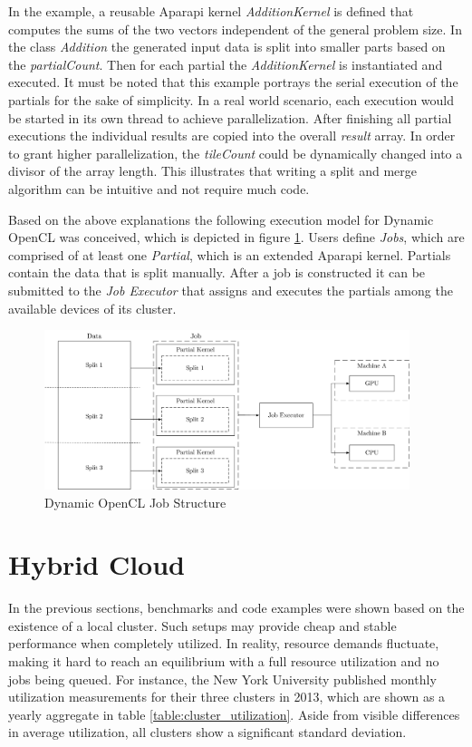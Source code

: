 In the example, a reusable Aparapi kernel \textit{AdditionKernel} is defined that computes the sums of the two vectors independent of the general problem size. In the class \textit{Addition} the generated input data is split into smaller parts based on the \textit{partialCount}. Then for each partial the \textit{AdditionKernel} is instantiated and executed. It must be noted that this example portrays the serial execution of the partials for the sake of simplicity. In a real world scenario, each execution would be started in its own thread to achieve parallelization. After finishing all partial executions the individual results are copied into the overall \textit{result} array. In order to grant higher parallelization, the \textit{tileCount} could be dynamically changed into a divisor of the array length. This illustrates that writing a split and merge algorithm can be intuitive and not require much code.

Based on the above explanations the following execution model for Dynamic OpenCL was conceived, which is depicted in figure \ref{img:dynamic_opencl_job}. Users define \textit{Jobs}, which are comprised of at least one \textit{Partial}, which is an extended Aparapi kernel. Partials contain the data that is split manually. After a job is constructed it can be submitted to the \textit{Job Executor} that assigns and executes the partials among the available devices of its cluster.

\begin{figure}[H]
	\includegraphics[width=0.95\textwidth]{drawings/dynamic_opencl_job.pdf}
	\centering
	\caption{Dynamic OpenCL Job Structure}
	\label{img:dynamic_opencl_job}
\end{figure}


\section{Hybrid Cloud}
\label{main_hybrid_cloud}
In the previous sections, benchmarks and code examples were shown based on the existence of a local cluster. Such setups may provide cheap and stable performance when completely utilized. In reality, resource demands fluctuate, making it hard to reach an equilibrium with a full resource utilization and no jobs being queued. For instance, the New York University published monthly utilization measurements for their three clusters in 2013\cite{nyu}, which are shown as a yearly aggregate in table \ref{table:cluster_utilization}. Aside from visible differences in average utilization, all clusters show a significant standard deviation.

